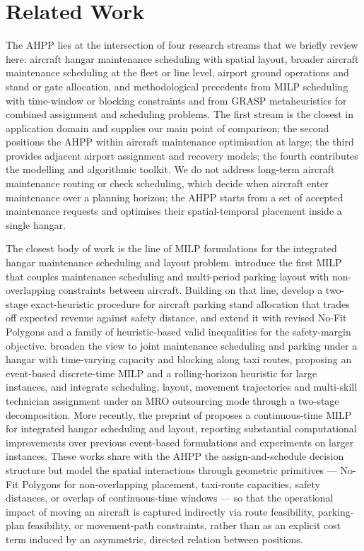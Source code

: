 \section{Related Work}
\label{sec:related}

The AHPP lies at the intersection of four research streams that we briefly
review here: aircraft hangar maintenance scheduling with spatial layout,
broader aircraft maintenance scheduling at the fleet or line level,
airport ground operations and stand or gate allocation, and methodological
precedents from MILP scheduling with time-window or blocking constraints
and from GRASP metaheuristics for combined assignment and scheduling
problems.  The first stream is the closest in application domain and
supplies our main point of comparison; the second positions the AHPP
within aircraft maintenance optimisation at large; the third provides
adjacent airport assignment and recovery models; the fourth contributes
the modelling and algorithmic toolkit.  We do not address long-term
aircraft maintenance routing or check scheduling, which decide when
aircraft enter maintenance over a planning horizon; the AHPP starts from
a set of accepted maintenance requests and optimises their
spatial-temporal placement inside a single hangar.

The closest body of work is the line of MILP formulations for the
integrated hangar maintenance scheduling and layout problem.
\citet{Qin2017} introduce the first MILP that couples maintenance
scheduling and multi-period parking layout with non-overlapping
constraints between aircraft.  Building on that line, \citet{Qin2018}
develop a two-stage exact-heuristic procedure for aircraft parking
stand allocation that trades off expected revenue against safety
distance, and \citet{Qin2018b} extend it with revised No-Fit Polygons
and a family of heuristic-based valid inequalities for the safety-margin
objective.  \citet{Qin2019} broaden the view to joint maintenance
scheduling and parking under a hangar with time-varying capacity and
blocking along taxi routes, proposing an event-based discrete-time MILP
and a rolling-horizon heuristic for large instances, and
\citet{Qin2020} integrate scheduling, layout, movement trajectories and
multi-skill technician assignment under an MRO outsourcing mode through
a two-stage decomposition.  More recently, the preprint of
\citet{Pazhooh2025} proposes a continuous-time MILP for integrated
hangar scheduling and layout, reporting substantial computational
improvements over previous event-based formulations and experiments on
larger instances.  These works share with the AHPP the
assign-and-schedule decision structure but model the spatial
interactions through geometric primitives --- No-Fit Polygons for
non-overlapping placement, taxi-route capacities, safety distances, or
overlap of continuous-time windows --- so that the operational impact
of moving an aircraft is captured indirectly via route feasibility,
parking-plan feasibility, or movement-path constraints, rather than as
an explicit cost term induced by an asymmetric, directed relation
between positions.

